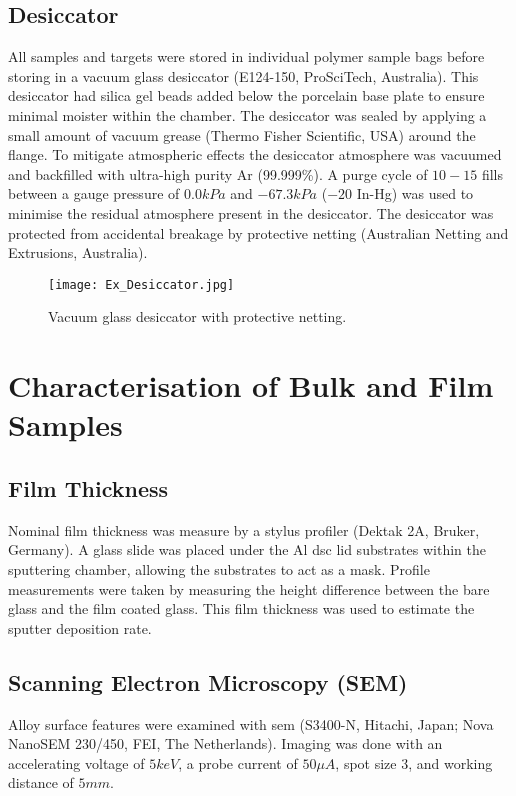 \subsection{Desiccator}
All samples and targets were stored in individual polymer sample bags before storing in a vacuum glass desiccator (E124-150, ProSciTech, Australia). This desiccator had silica gel beads added below the porcelain base plate to ensure minimal moister within the chamber. The desiccator was sealed by applying a small amount of vacuum grease (Thermo Fisher Scientific, USA) around the flange. To mitigate atmospheric effects the desiccator atmosphere was vacuumed and backfilled with ultra-high purity Ar (99.999\%). A purge cycle of $10 - 15$ fills between a gauge pressure of $0.0 kPa$ and $-67.3 kPa$ ($-20$ In-Hg) was used to minimise the residual atmosphere present in the desiccator. The desiccator was protected from accidental breakage by protective netting (Australian Netting and Extrusions, Australia).

\begin{figure}[htbp]
	\centering
	\texttt{[image: Ex\_Desiccator.jpg]}
	\caption{Vacuum glass desiccator with protective netting.}
	\label{fig:Desiccator}
\end{figure}

\section{Characterisation of Bulk and Film Samples}

\subsection{Film Thickness}
Nominal film thickness was measure by a stylus profiler (Dektak 2A, Bruker, Germany). A glass slide was placed under the Al \gls{dsc} lid substrates within the sputtering chamber, allowing the substrates to act as a mask. Profile measurements were taken by measuring the height difference between the bare glass and the film coated glass. This film thickness was used to estimate the sputter deposition rate.  

\subsection{Scanning Electron Microscopy (SEM)}
Alloy surface features were examined with \gls{sem} (S3400-N, Hitachi, Japan; Nova NanoSEM 230/450, FEI, The Netherlands). Imaging was done with an accelerating voltage of $5keV$, a probe current of $50 \mu A$, spot size 3, and working distance of $5mm$.

